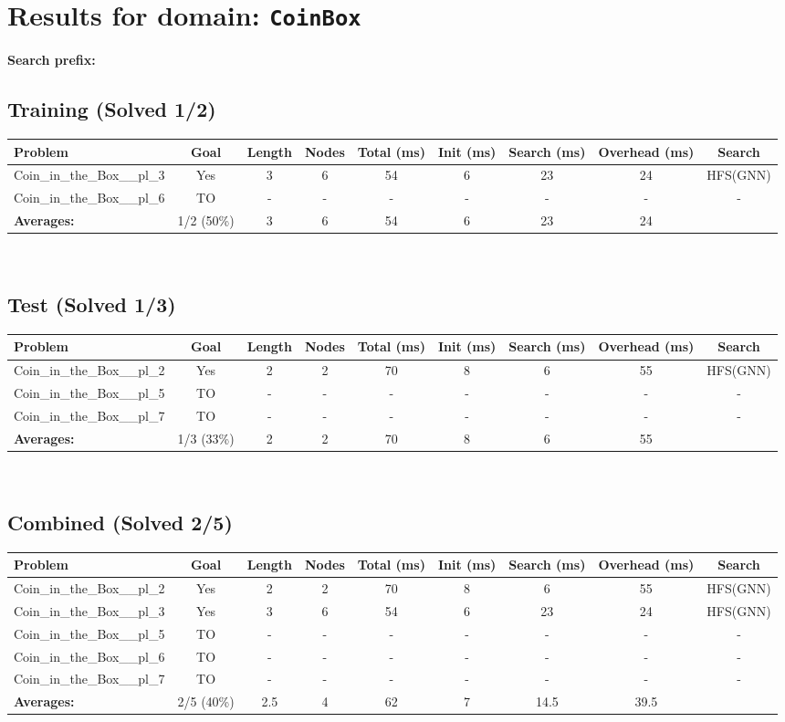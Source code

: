 \documentclass{article}
\begin{document}
\section*{Results for domain: \texttt{CoinBox}}
\textbf{Search prefix:} 
\\[0.5cm]
\subsection*{Training (Solved 1/2)}
\begin{tabular}{lcccccccc}
\toprule
Problem & Goal & Length & Nodes & Total (ms) & Init (ms) & Search (ms) & Overhead (ms) & Search \\
\midrule
Coin\_in\_the\_Box\_\_pl\_3 & Yes & 3 & 6 & 54 & 6 & 23 & 24 & HFS(GNN) \\
Coin\_in\_the\_Box\_\_pl\_6 & TO & - & - & - & - & - & - & - \\
\textbf{Averages:} & 1/2 (50\%) & 3 & 6 & 54 & 6 & 23 & 24 & \\
\bottomrule
\end{tabular}
\\[0.7cm]
\subsection*{Test (Solved 1/3)}
\begin{tabular}{lcccccccc}
\toprule
Problem & Goal & Length & Nodes & Total (ms) & Init (ms) & Search (ms) & Overhead (ms) & Search \\
\midrule
Coin\_in\_the\_Box\_\_pl\_2 & Yes & 2 & 2 & 70 & 8 & 6 & 55 & HFS(GNN) \\
Coin\_in\_the\_Box\_\_pl\_5 & TO & - & - & - & - & - & - & - \\
Coin\_in\_the\_Box\_\_pl\_7 & TO & - & - & - & - & - & - & - \\
\textbf{Averages:} & 1/3 (33\%) & 2 & 2 & 70 & 8 & 6 & 55 & \\
\bottomrule
\end{tabular}
\\[0.7cm]
\subsection*{Combined (Solved 2/5)}
\begin{tabular}{lcccccccc}
\toprule
Problem & Goal & Length & Nodes & Total (ms) & Init (ms) & Search (ms) & Overhead (ms) & Search \\
\midrule
Coin\_in\_the\_Box\_\_pl\_2 & Yes & 2 & 2 & 70 & 8 & 6 & 55 & HFS(GNN) \\
Coin\_in\_the\_Box\_\_pl\_3 & Yes & 3 & 6 & 54 & 6 & 23 & 24 & HFS(GNN) \\
Coin\_in\_the\_Box\_\_pl\_5 & TO & - & - & - & - & - & - & - \\
Coin\_in\_the\_Box\_\_pl\_6 & TO & - & - & - & - & - & - & - \\
Coin\_in\_the\_Box\_\_pl\_7 & TO & - & - & - & - & - & - & - \\
\textbf{Averages:} & 2/5 (40\%) & 2.5 & 4 & 62 & 7 & 14.5 & 39.5 & \\
\bottomrule
\end{tabular}
\\[0.7cm]
\end{document}
